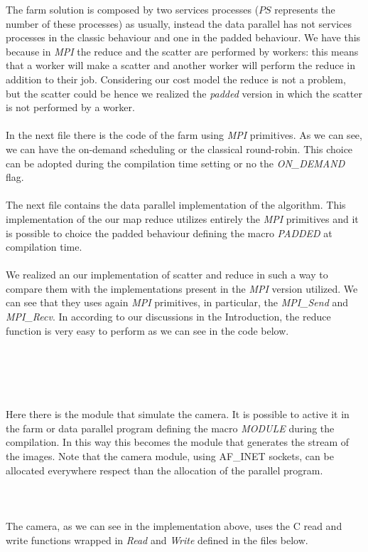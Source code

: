 The farm solution is composed by two services processes ($PS$ represents the number of these processes) as usually, instead the data parallel has not services processes in the classic behaviour and one in the padded behaviour. We have this because in \textit{MPI} the reduce and the scatter are performed by workers: this means that a worker will make a scatter and another worker will perform the reduce in addition to their job. Considering our cost model the reduce is not a problem, but the scatter could be hence we realized the \textit{padded} version in which the scatter is not performed by a worker.
\ \\

\ \\
In the next file there is the code of the farm using \textit{MPI} primitives. As we can see, we can have the on-demand scheduling or the classical round-robin. This choice can be adopted during the compilation time setting or no the \textit{ON\_DEMAND} flag.
\ \\

\ \\
The next file contains the data parallel implementation of the algorithm. This implementation of the our map reduce utilizes entirely the \textit{MPI} primitives and it is possible to choice the padded behaviour defining the macro \textit{PADDED} at compilation time.
\ \\

\ \\
We realized an our implementation of scatter and reduce in such a way to compare them with the implementations present in the \textit{MPI} version utilized. We can see that they uses again \textit{MPI} primitives, in particular, the \textit{MPI\_Send} and \textit{MPI\_Recv}. In according to our discussions in the Introduction, the reduce function is very easy to perform as we can see in the code below.
\ \\

\ \\
\ \\

\ \\
\ \\

\ \\
Here there is the module that simulate the camera. It is possible to active it in the farm or data parallel program defining the macro \textit{MODULE} during the compilation. In this way this becomes the module that generates the stream of the images. Note that the camera module, using AF\_INET sockets, can be allocated everywhere respect than the allocation of the parallel program.
\ \\

\ \\
\ \\

\ \\
The camera, as we can see in the implementation above, uses the C read and write functions wrapped in \textit{Read} and \textit{Write} defined in the files below.
\ \\

\ \\
\ \\

\ \\